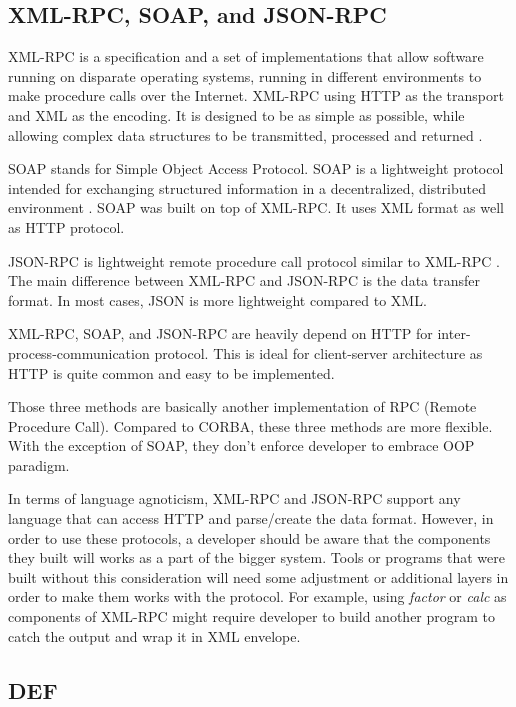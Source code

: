 \documentclass[conference]{IEEEtran}
\begin{document}
\subsection{XML-RPC, SOAP, and JSON-RPC}

XML-RPC is a specification and a set of implementations that allow software running on 
disparate operating systems, running in different environments to make procedure 
calls over the Internet. XML-RPC using HTTP as the transport and XML as the encoding.
It is designed to be as simple as possible, while allowing complex data structures to 
be transmitted, processed and returned \cite{xmlrpc}.

SOAP stands for Simple Object Access Protocol. SOAP is a lightweight protocol 
intended for exchanging structured information in a decentralized, distributed 
environment \cite{soap}. SOAP was built on top of XML-RPC. It uses XML format as 
well as HTTP protocol.

JSON-RPC is lightweight remote procedure call protocol similar to XML-RPC 
\cite{jsonrpc}. The main difference between XML-RPC and JSON-RPC is the data transfer
format. In most cases, JSON is more lightweight compared to XML.

XML-RPC, SOAP, and JSON-RPC are heavily depend on HTTP for inter-process-communication 
protocol. This is ideal for client-server architecture as HTTP is quite common and
easy to be implemented.

Those three methods are basically another implementation of RPC (Remote Procedure Call). 
Compared to CORBA, these three methods are more flexible. With the exception of SOAP,
they don't enforce developer to embrace OOP paradigm.

In terms of language agnoticism, XML-RPC and JSON-RPC support any language that can
access HTTP and parse/create the data format. However, in order to use these protocols,
a developer should be aware that the components they built will works as a part of the
bigger system. Tools or programs that were built without this consideration will need
some adjustment or additional layers in order to make them works with the protocol.
For example, using {\it{factor}} or {\it{calc}} as components of XML-RPC might require
developer to build another program to catch the output and wrap it in XML envelope.

\subsection{DEF}
\end{document}

